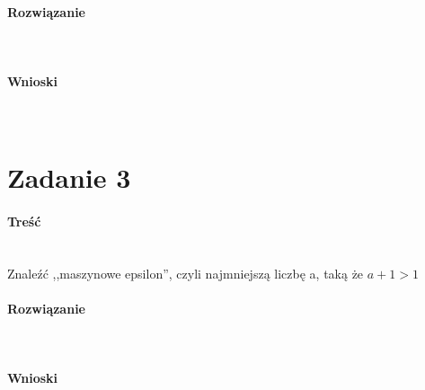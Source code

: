 \documentclass{article}
\begin{document}
  \paragraph{Rozwiązanie} ~\\
  

  \paragraph{Wnioski} ~\\


  \newpage
  \section*{Zadanie 3} \label{sec:zadanie_3}

  \paragraph{Treść} ~\\
  Znaleźć ,,maszynowe epsilon'', czyli najmniejszą liczbę a, taką że $ a + 1 > 1 $ \\

  \paragraph{Rozwiązanie} ~\\
  

  \paragraph{Wnioski} ~\\
\end{document}
